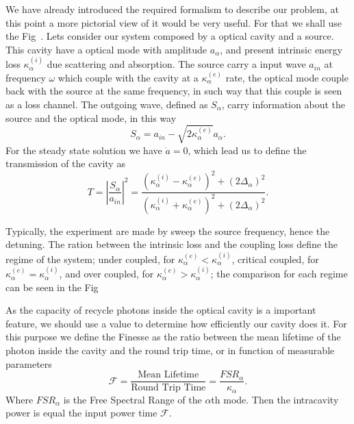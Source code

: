 We have already introduced the required formalism to describe our problem, at this point a more pictorial view of it would be very useful. For that we shall use the Fig~. Lets consider our system composed by a optical cavity and a source. This cavity have a optical mode with amplitude $a_\alpha$, and present intrinsic energy loss $\kappa_\alpha^{(i)}$ due scattering and absorption. The source carry a input wave $a_{in}$ at frequency $\omega$ which couple with the cavity at a $\kappa_\alpha^{(e)}$ rate, the optical mode couple back with the source at the same frequency, in such way that this couple is seen as a loss channel. The outgoing wave, defined as $S_\alpha$, carry information about the source and the optical mode, in this way
\begin{equation}
    S_\alpha = a_{in} - \sqrt{2 \kappa_\alpha^{(e)}}a_\alpha.
\end{equation}
For the steady state solution we have $\dot{a} = 0$, which lead us to define the transmission of the cavity as
\begin{equation}
    T = \left|\frac{S_\alpha}{a_{in}}\right|^2 = \frac{\left(\kappa_\alpha^{(i)} -\kappa_\alpha^{(e)}\right)^2 + (2\Delta_\alpha)^2}{\left(\kappa_\alpha^{(i)} +\kappa_\alpha^{(e)}\right)^2 + (2\Delta_\alpha)^2}.
    \label{eq:single_mode_transmission}
\end{equation}

Typically, the experiment are made by sweep the source frequency, hence the detuning. The ration between the intrinsic loss and the coupling loss define the regime of the system; under coupled, for $\kappa_\alpha^{(e)} < \kappa_\alpha^{(i)}$, critical coupled, for $\kappa_\alpha^{(e)} = \kappa_\alpha^{(i)}$, and over coupled, for $\kappa_\alpha^{(e)} > \kappa_\alpha^{(i)}$; the comparison for each regime can be seen in the Fig~ 

As the capacity of recycle photons inside the optical cavity is a important feature, we should use a value to determine how efficiently our cavity does it. For this purpose we define the Finesse as the ratio between the mean lifetime of the photon inside the cavity and the round trip time, or in function of measurable parameters 
\begin{equation}
    \mathcal{F} = \frac{\text{Mean Lifetime}}{\text{Round Trip Time}} = \frac{FSR_\alpha}{\kappa_\alpha}.
    \label{eq:finesse}
\end{equation}
Where $FSR_\alpha$ is the Free Spectral Range of the $\alpha$th mode. Then the intracavity power is equal the input power time $\mathcal{F}$.


